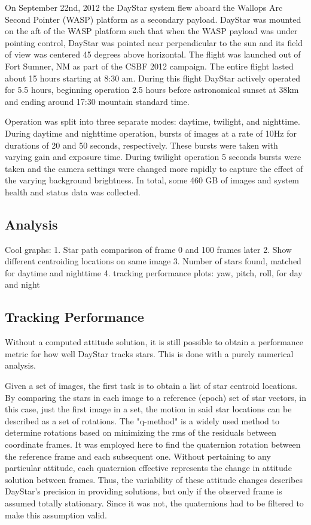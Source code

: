\documentclass[twocolumn,letterpaper]{IEEEAerospace2012}
\begin{document}
On September 22nd, 2012 the DayStar system flew aboard the Wallops Arc Second Pointer (WASP) platform as a secondary payload. DayStar was mounted on the aft of the WASP platform such that when the WASP payload was under pointing control, DayStar was pointed near perpendicular to the sun and its field of view was centered 45 degrees above horizontal. The flight was launched out of Fort Sumner, NM as part of the CSBF 2012 campaign. The entire flight lasted about 15 hours starting at 8:30 am. During this flight DayStar actively operated for 5.5 hours, beginning operation 2.5 hours before astronomical sunset at 38km and ending around 17:30 mountain standard time.

Operation was split into three separate modes: daytime, twilight, and nighttime. During daytime and nighttime operation, bursts of images at a rate of 10Hz for durations of 20 and 50 seconds, respectively. These bursts were taken with varying gain and exposure time. During twilight operation 5 seconds bursts were taken and the camera settings were changed more rapidly to capture the effect of the varying background brightness. In total, some 460 GB of images and system health and status data was collected.

\subsection{Analysis}
Cool graphs:
1. Star path comparison of frame 0 and 100 frames later
2. Show different centroiding locations on same image
3. Number of stars found, matched for daytime and nighttime
4. tracking performance plots: yaw, pitch, roll, for day and night

\subsection{Tracking Performance}
Without a computed attitude solution, it is still possible to obtain a performance metric for how well DayStar tracks stars. This is done with a purely numerical analysis.

Given a set of images, the first task is to obtain a list of star centroid locations. By comparing the stars in each image to a reference (epoch) set of star vectors, in this case, just the first image in a set, the motion in said star locations can be described as a set of rotations. The "q-method" is a widely used method to determine rotations based on minimizing the rms of the residuals between coordinate frames. It was employed here to find the quaternion rotation between the reference frame and each subsequent one. Without pertaining to any particular attitude, each quaternion effective represents the change in attitude solution between frames. Thus, the variability of these attitude changes describes DayStar's precision in providing solutions, but only if the observed frame is assumed totally stationary. Since it was not, the quaternions had to be filtered to make this assumption valid.
\end{document}
